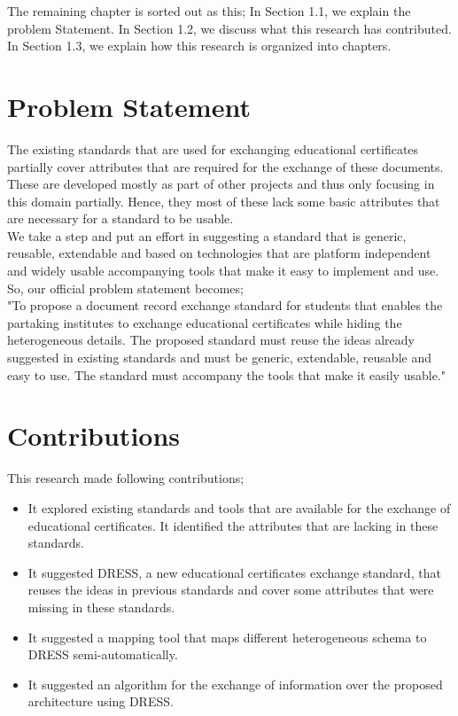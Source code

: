 \documentclass[12pt,a4paper,oneside]{book}
\begin{document}
The remaining chapter is sorted out as this; In Section 1.1, we explain the problem Statement. In Section 1.2, we discuss what this research has contributed. In Section 1.3, we explain how this research is organized into chapters.

\section{Problem Statement}\label{s-problem_statement}

The existing standards that are used for exchanging educational certificates partially cover attributes that are required for the exchange of these documents. These are developed mostly as part of other projects and thus only focusing in this domain partially. Hence, they most of these lack some basic attributes that are necessary for a standard to be usable. \\

We take a step and put an effort in suggesting a standard that is generic, reusable, extendable and based on technologies that are platform independent and widely usable accompanying tools that make it easy to implement and use. So, our official problem statement becomes; \\   

"To propose a document record exchange standard for students that enables the partaking institutes to exchange educational certificates while hiding the heterogeneous details. The proposed standard must reuse the ideas already suggested in existing standards and must be generic, extendable, reusable and easy to use. The standard must accompany the tools that make it easily usable." \\

\section{Contributions}\label{s-contributions}
This research made following contributions;

\begin{itemize}
\item
It explored existing standards and tools that are available for the exchange of educational certificates. It identified the attributes that are lacking in these standards. 
\item
It suggested DRESS, a new educational certificates exchange standard, that reuses the ideas in previous standards and cover some attributes that were missing in these standards.
\item
It suggested a mapping tool that maps different heterogeneous schema to DRESS semi-automatically.
\item
It suggested an algorithm for the exchange of information over the proposed architecture using DRESS.

\end{itemize}
\end{document}
